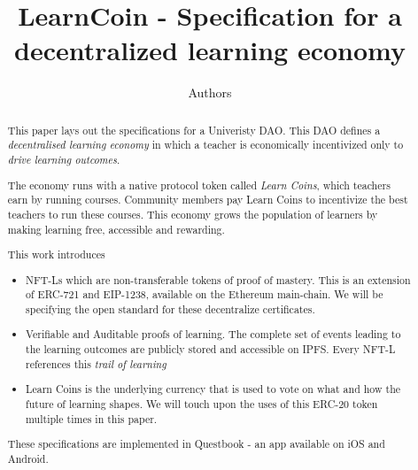 \documentclass{article}
\author{Authors}
\title{LearnCoin - Specification for a decentralized learning economy}
\begin{document}
  \maketitle
  \begin{abstract}
    This paper lays out the specifications for a Univeristy DAO.
    This DAO defines a \textit{decentralised learning economy} in which a teacher is economically incentivized only to \textit{drive learning outcomes}.
    \par
    The economy runs  with a native protocol token called  \textit{Learn Coins}, which teachers earn by running courses. 
    Community members pay Learn Coins to incentivize the best teachers to run these courses.
    This economy grows the population of learners by making learning free, accessible and rewarding. %
    \par
    This work introduces
    \begin{itemize}
      \item NFT-Ls which are non-transferable tokens of proof of mastery. 
        This is an extension of ERC-721 and EIP-1238, available on the Ethereum main-chain. 
        We will be specifying the open standard for these decentralize certificates.
      \item Verifiable and Auditable proofs of learning. 
        The complete set of events leading to the learning outcomes are publicly stored and accessible on IPFS.
        Every NFT-L references this \textit{trail of learning}
      \item Learn Coins is the underlying currency that is used to vote on what and how the future of learning shapes. 
        We will touch upon the uses of this ERC-20 token multiple times in this paper.
    \end{itemize}
    \par
    These specifications are implemented in Questbook - an app available on iOS and Android.
  \end{abstract}
\end{document}
